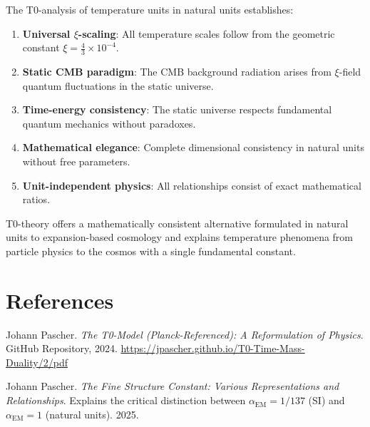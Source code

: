 \documentclass[12pt,a4paper]{article}
\begin{document}
	The T0-analysis of temperature units in natural units establishes:
	
	\begin{enumerate}
		\item \textbf{Universal $\xi$-scaling}: All temperature scales follow from the geometric constant $\xi = \frac{4}{3} \times 10^{-4}$.
		
		\item \textbf{Static CMB paradigm}: The CMB background radiation arises from $\xi$-field quantum fluctuations in the static universe.
		
		\item \textbf{Time-energy consistency}: The static universe respects fundamental quantum mechanics without paradoxes.
		
		\item \textbf{Mathematical elegance}: Complete dimensional consistency in natural units without free parameters.
		
		\item \textbf{Unit-independent physics}: All relationships consist of exact mathematical ratios.
	\end{enumerate}
	
	\begin{revolutionary}
		T0-theory offers a mathematically consistent alternative formulated in natural units to expansion-based cosmology and explains temperature phenomena from particle physics to the cosmos with a single fundamental constant.
	\end{revolutionary}
	
	\section{References}
	
	\begin{thebibliography}{2}
		Johann Pascher.
		\textit{The T0-Model (Planck-Referenced): A Reformulation of Physics}.
		GitHub Repository, 2024.
		\url{https://jpascher.github.io/T0-Time-Mass-Duality/2/pdf}
		
		Johann Pascher.
		\textit{The Fine Structure Constant: Various Representations and Relationships}.
		Explains the critical distinction between $\alpha_{\text{EM}} = 1/137$ (SI) and $\alpha_{\text{EM}} = 1$ (natural units).
		2025.
	\end{thebibliography}
	
\end{document}
